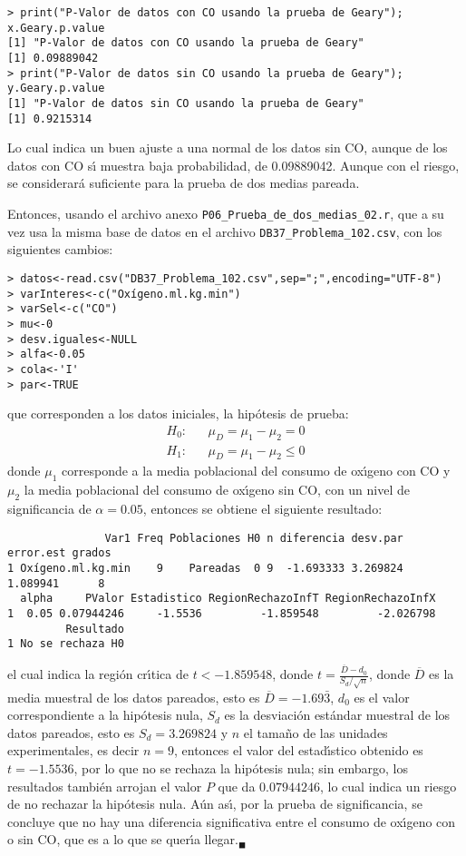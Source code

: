 \begin{solucion}
\begin{verbatim}
> print("P-Valor de datos con CO usando la prueba de Geary"); x.Geary.p.value
[1] "P-Valor de datos con CO usando la prueba de Geary"
[1] 0.09889042
> print("P-Valor de datos sin CO usando la prueba de Geary"); y.Geary.p.value
[1] "P-Valor de datos sin CO usando la prueba de Geary"
[1] 0.9215314
 \end{verbatim}
 \vspace{-0.5cm}
 Lo cual indica un buen ajuste a una normal de los datos sin CO,
 aunque de los datos con CO s\'{\i} muestra baja probabilidad,
 de 0.09889042.
 Aunque con el riesgo, se considerar\'a suficiente para la prueba
 de dos medias pareada.
 \par 
 Entonces, usando el archivo anexo
 \texttt{P06\_Prueba\_de\_dos\_medias\_02.r}, que a su vez usa
 la misma base de datos en el archivo \texttt{DB37\_Problema\_102.csv},
 con los siguientes cambios:
 \begin{verbatim}
> datos<-read.csv("DB37_Problema_102.csv",sep=";",encoding="UTF-8")
> varInteres<-c("Oxígeno.ml.kg.min")
> varSel<-c("CO")
> mu<-0
> desv.iguales<-NULL
> alfa<-0.05
> cola<-'I'
> par<-TRUE
 \end{verbatim}
 \vspace{-0.5cm}
 que corresponden a los datos iniciales, la hip\'otesis de prueba:
 \begin{eqnarray*}
  H_0: & & \mu_D = \mu_1 - \mu_2 = 0 \\
  H_1: & & \mu_D = \mu_1 - \mu_2 \leq 0
 \end{eqnarray*}
 donde $\mu_1$ corresponde a la media poblacional del consumo
 de ox\'{\i}geno con CO y $\mu_2$ la media poblacional del consumo
 de ox\'{\i}geno sin CO, con un nivel de significancia de $\alpha = 0.05$,
 entonces se obtiene el siguiente resultado:
 \begin{verbatim}
               Var1 Freq Poblaciones H0 n diferencia desv.par error.est grados
1 Oxígeno.ml.kg.min    9    Pareadas  0 9  -1.693333 3.269824  1.089941      8
  alpha     PValor Estadistico RegionRechazoInfT RegionRechazoInfX
1  0.05 0.07944246     -1.5536         -1.859548         -2.026798
         Resultado
1 No se rechaza H0
 \end{verbatim}
 \vspace{-0.5cm}
 el cual indica la regi\'on cr\'{\i}tica de $t < -1.859548$, 
 donde $t = \frac{\overline{D} - d_0}{S_d/\sqrt{n}}$,
 donde $\overline{D}$ es la media muestral de los datos pareados,
 esto es $\overline{D} = -1.69\bar{3}$, $d_0$ es el valor correspondiente
 a la hip\'otesis nula, $S_d$ es la desviaci\'on est\'andar muestral
 de los datos pareados, esto es $S_d = 3.269824$ y $n$ el tama\~no
 de las unidades experimentales, es decir $n=9$,
 entonces el valor del estad\'{\i}stico obtenido es $t = -1.5536$,
 por lo que no se rechaza la hip\'otesis nula; sin embargo, 
 los resultados tambi\'en arrojan el valor $P$ que da $0.07944246$,
 lo cual indica un riesgo de no rechazar la hip\'otesis nula.
 A\'un as\'{\i}, por la prueba de significancia,
 se concluye que no hay una diferencia significativa entre el consumo
 de ox\'{\i}geno con o sin CO,
 que es a lo que se quer\'{\i}a llegar.${}_{\blacksquare}$
\end{solucion}
